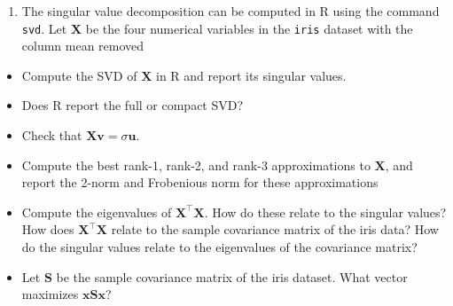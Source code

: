 \documentclass[]{book}
\newenvironment{Shaded}{\begin{snugshade}}{\end{snugshade}}
\newcommand{\CommentTok}[1]{\textcolor[rgb]{0.56,0.35,0.01}{\textit{#1}}}
\newcommand{\DecValTok}[1]{\textcolor[rgb]{0.00,0.00,0.81}{#1}}
\newcommand{\KeywordTok}[1]{\textcolor[rgb]{0.13,0.29,0.53}{\textbf{#1}}}
\newcommand{\NormalTok}[1]{#1}
\newcommand{\OperatorTok}[1]{\textcolor[rgb]{0.81,0.36,0.00}{\textbf{#1}}}
\newcommand{\StringTok}[1]{\textcolor[rgb]{0.31,0.60,0.02}{#1}}
\providecommand{\tightlist}{%
  \setlength{\itemsep}{0pt}\setlength{\parskip}{0pt}}
\theoremstyle{definition}
\theoremstyle{definition}
\theoremstyle{definition}
\theoremstyle{remark}
\begin{document}
\begin{enumerate}
\def\labelenumi{\arabic{enumi}.}
\setcounter{enumi}{1}
\tightlist
\item
  The singular value decomposition can be computed in R using the command \texttt{svd}. Let \(\boldsymbol X\) be the four numerical variables in the \texttt{iris} dataset with the column mean removed
\end{enumerate}

\begin{Shaded}
\end{Shaded}

\begin{itemize}
\item
  Compute the SVD of \(\boldsymbol X\) in R and report its singular values.
\item
  Does R report the full or compact SVD?
\item
  Check that \(\boldsymbol X\boldsymbol v= \sigma \boldsymbol u\).
\item
  Compute the best rank-1, rank-2, and rank-3 approximations to \(\boldsymbol X\), and report the 2-norm and Frobenious norm for these approximations
\item
  Compute the eigenvalues of \(\boldsymbol X^\top \boldsymbol X\). How do these relate to the singular values? How does \(\boldsymbol X^\top \boldsymbol X\) relate to the sample covariance matrix of the iris data? How do the singular values relate to the eigenvalues of the covariance matrix?
\item
  Let \(\boldsymbol S\) be the sample covariance matrix of the iris dataset. What vector maximizes \(\boldsymbol x\boldsymbol S\boldsymbol x\)?
\end{itemize}
\end{document}

